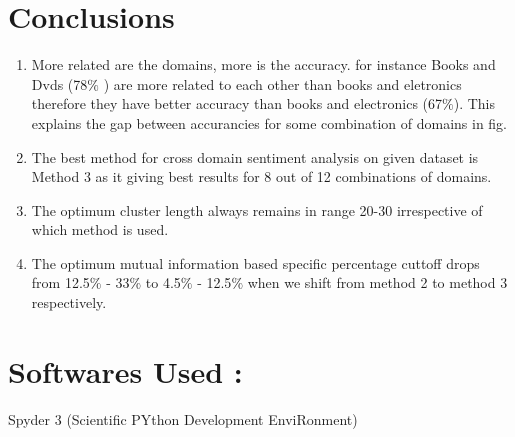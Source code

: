 \documentclass{report}
\begin{document}

\chapter{Conclusions}
\begin{enumerate}[label=(\roman*)]
\item More related are the domains, more is the accuracy. for instance Books and Dvds (78\(\%\) ) are more related to each other than books and eletronics therefore they have better accuracy than books and electronics (67\(\%\)). This explains the gap between accurancies for some combination of domains in fig.
\item The best method for cross domain sentiment analysis on given dataset is Method 3 as it giving best results for 8 out of 12 combinations of domains.
\item The optimum cluster length always remains in range 20-30 irrespective of which method is used.
\item The optimum mutual information based specific percentage cuttoff drops from 12.5\(\%\) - 33\(\%\) to 4.5\(\%\) - 12.5\(\%\) when we shift from method 2 to method 3 respectively.
\end{enumerate}

\chapter{Softwares Used :}
Spyder 3 (Scientific PYthon Development EnviRonment)
\end{document}
